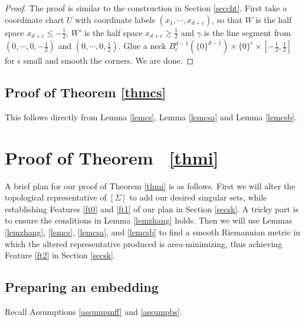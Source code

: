 \documentclass[11pt,a4paper]{amsart}
\numberwithin{equation}{section}
\newcommand{\ga}{\gamma}
\newcommand{\e}{\epsilon}
\newcommand{\Si}{\Sigma}
\newcommand{\cd}{\cdots}
\theoremstyle{plain}
\theoremstyle{definition}
\numberwithin{equation}{subsection}
\begin{document}
	\begin{proof}
		The proof is similar to the construction in Section \ref{seccht}. First take a coordinate chart $U$ with coordinate labels $(x_1,\cd,x_{d+c})$, so that $W$ is the half space $x_{d+c}\le -\frac{1}{2}$, $W'$ is the half space $x_{d+c}\ge \frac{1}{2}$ and $\ga$ is the line segment from $(0,\cd,0,-\frac{1}{2})$ and $(0,\cd,0,\frac{1}{2}).$ Glue a neck $B_\e^{d-1}(\{0\}^{d-1})\times\{0\}^c\times [-\frac{1}{2},\frac{1}{2}]$ for $\e$ small and smooth the corners. We are done.
	\end{proof}
	\subsection{Proof of Theorem \ref{thmcs}}
	This follows directly from Lemma \ref{lemcs}, Lemma \ref{lemcsa} and Lemma \ref{lemcsb}.
	\section{Proof of Theorem  \ref{thmi}}\label{secpf}
	A brief plan for our proof of Theorem \ref{thmi} is as follows. First we will alter the topological representative of $[\Si]$ to add our desired singular sets, while establishing Features \ref{ft0} and \ref{ft1} of our plan in Section \ref{secsk}. A tricky part is to ensure the conditions in Lemma \ref{lemzhang} holds. Then we will use Lemmas \ref{lemzhang}, \ref{lemcs}, \ref{lemcsa}, and \ref{lemcsb} to find a smooth Riemannian metric in which the altered representative produced is area-minimizing, thus achieving Feature \ref{ft2} in Section \ref{secsk}.
	\subsection{Preparing an embedding}
	Recall Assumptions \ref{assumpmff} and \ref{assumpbs}. 
	
\end{document}

